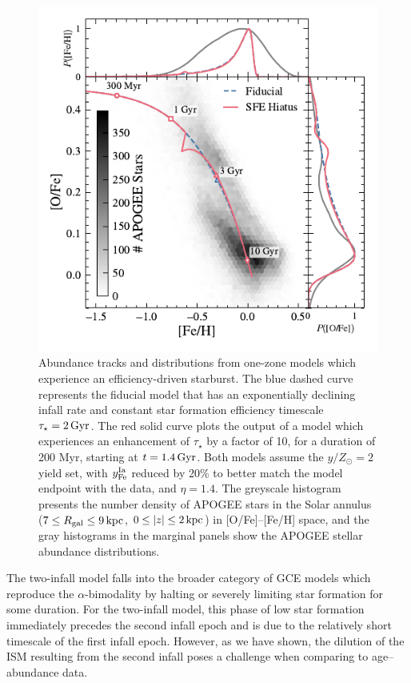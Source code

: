 \documentclass[twocolumn,twocolappendix,linenumbers]{aastex631}
\newcommand{\yZ}[1]{$y/Z_\odot=#1$}
\newcommand{\kpc}{\,{\rm kpc}}
\begin{document}
\begin{figure}
    \centering
    \includegraphics{figures/onezone_sfe_hiatus.pdf}
    \caption{Abundance tracks and distributions from one-zone models which experience an efficiency-driven starburst. The blue dashed curve represents the fiducial model that has an exponentially declining infall rate and constant star formation efficiency timescale $\tau_\star=2\,{\rm Gyr}$. The red solid curve plots the output of a model which experiences an enhancement of $\tau_\star$ by a factor of 10, for a duration of 200 Myr, starting at $t=1.4\,{\rm Gyr}$. Both models assume the \yZ{2} yield set, with $y_{\rm Fe}^{\rm Ia}$ reduced by 20\% to better match the model endpoint with the data, and $\eta=1.4$. The greyscale histogram presents the number density of APOGEE stars in the Solar annulus ($7\leq R_{\rm gal}\leq 9\kpc$, $0\leq|z|\leq2\kpc$) in [O/Fe]--[Fe/H] space, and the gray histograms in the marginal panels show the APOGEE stellar abundance distributions.}
    \label{fig:onezone-sfe-hiatus}
\end{figure}

The two-infall model falls into the broader category of GCE models which reproduce the $\alpha$-bimodality by halting or severely limiting star formation for some duration. For the two-infall model, this phase of low star formation immediately precedes the second infall epoch and is due to the relatively short timescale of the first infall epoch. However, as we have shown, the dilution of the ISM resulting from the second infall poses a challenge when comparing to age--abundance data.
\end{document}
